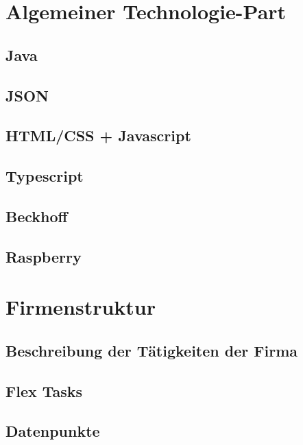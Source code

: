\section{Algemeiner Technologie-Part}


\subsection{Java}
\subsection{JSON}
\subsection{HTML/CSS + Javascript}
\subsection{Typescript}
\subsection{Beckhoff}
\subsection{Raspberry}


\section{Firmenstruktur}


\subsection{Beschreibung der Tätigkeiten der Firma}
\subsection{Flex Tasks}
\subsection{Datenpunkte}

